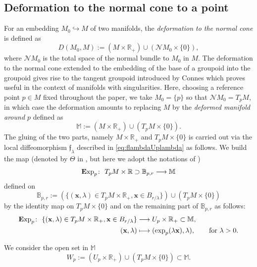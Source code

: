 \documentclass[10pt,a4paper]{amsart}
\numberwithin{equation}{section}
\theoremstyle{definition}
\newcommand{\R}{\mathbb R}
\newcommand{\B}{\mathbb B}
\newcommand{\M}{\mathbb M}
\newcommand{\Exp}{{\mathbf E}{\rm xp}}
\begin{document}
\subsection{Deformation to the normal cone to a point}%
For an embedding $M_0\hookrightarrow M$ of two manifolds, the {\it deformation to the normal cone} is defined as
\begin{equation*}
D(M_0, M):= (M\times \R_+ )\cup ({\mathcal N } M_0\times\{0\}),
\end{equation*}
where ${\mathcal N } M_0$ is the total space of the normal bundle to $M_0$ in $M$. The deformation to the normal cone extended to the embedding of the base of a groupoid into the groupoid gives rise to the tangent groupoid introduced by Connes \cite{C} which proves useful in the context of manifolds with singularities. Here, choosing a reference point $p\in M$ fixed throughout the paper, we take $M_0=\{p\}$ so that ${\mathcal N } M_0=T_{p}M$, in which case the deformation amounts to replacing $M$ by the {\it deformed manifold around $p$} defined as
\[
\mathbb M:=(M\times \R_+ )\cup (T_{p}M\times\{0\}).
\]
 The gluing of the two parts, namely $M\times \R_+$ and $T_{p}M\times\{0\}$ is carried out via the local diffeomorphism $\mathfrak{f}_\lambda$ described in \eqref{eq:flambdaUplambda} as follows. We build the map (denoted by $\Theta$ in \cite[Section~3.1]{DS2}, but here we adopt the notations of \cite{vEY})
 \[
 \Exp_{p}\colon \ T_pM\times\R\supset \B_{p, r }\longrightarrow \M
 \]
defined on
 \[
 \B_{p,r}:= (\{({\mathbf x}, \lambda)\in T_{p}M\times \R_+, {\mathbf x}\in B_{r/
\lambda}\} )\cup (T_{p}M\times \{0\} )
\]
 by the identity map on $T_{p}M\times \{0\}$ and on the remaining part of $\B_{p,r}$ as follows:
 \begin{align}
 \Exp_{p}\colon \ \{ ({\mathbf x}, \lambda)\in T_{p}M\times \R_+, {\mathbf x}\in B_{r/
\lambda}\}&\longrightarrow U_{p}\times \R_+ \subset\mathbb M,\nonumber\\
({\mathbf x}, \lambda)&\longmapsto (\exp_{p}(\lambda {\mathbf x}), \lambda), \qquad {\rm for}\ \lambda>0.\label{eq:Fx0}
\end{align}

We consider the open set in $\M$ \cite[Section~1.1]{DS1} \[W_{p}:= ( U_{p}\times \R_+)\cup (T_{p} M\times\{0\} )\subset \M .\]
\end{document}
